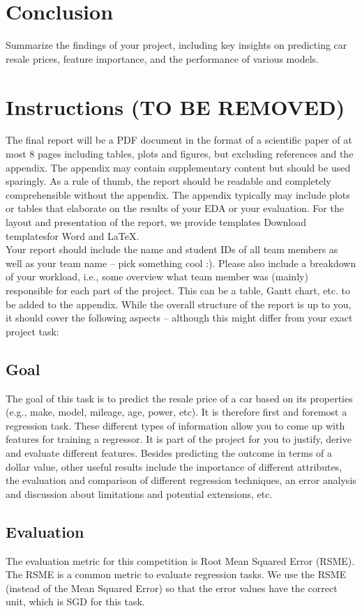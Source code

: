 \documentclass[conference]{IEEEtran}
\begin{document}
\section{Conclusion}
\label{sec:conclusion}
Summarize the findings of your project, including key insights on predicting car resale prices, feature importance, and the performance of various models.


\newpage
\section{Instructions (TO BE REMOVED)}
The final report will be a PDF document in the format of a scientific paper of at most 8 pages including tables, plots and figures, but excluding references and the appendix. The appendix may contain supplementary content but should be used sparingly. As a rule of thumb, the report should be readable and completely comprehensible without the appendix. The appendix typically may include plots or tables that elaborate on the results of your EDA or your evaluation. For the layout and presentation of the report, we provide templates Download templatesfor Word and LaTeX.
\\
Your report should include the name and student IDs of all team members as well as your team name – pick something cool :). Please also include a breakdown of your workload, i.e., some overview what team member was (mainly) responsible for each part of the project. This can be a table, Gantt chart, etc. to be added to the appendix. While the overall structure of the report is up to you, it should cover the following aspects – although this might differ from your exact project task:
\subsection{Goal}
The goal of this task is to predict the resale price of a car based on its properties 
(e.g., make, model, mileage, age, power, etc). It is therefore first and foremost a regression task. 
These different types of information allow you to come up with features for training a regressor. 
It is part of the project for you to justify, derive and evaluate different features. 
Besides predicting the outcome in terms of a dollar value, other useful results include the importance of 
different attributes, the evaluation and comparison of different regression techniques, an error analysis 
and discussion about limitations and potential extensions, etc.
\subsection{Evaluation}
The evaluation metric for this competition is Root Mean Squared Error (RSME). The RSME is a common metric to evaluate regression tasks. We use the RSME (instead of the Mean Squared Error) so that the error values have the correct unit, which is SGD for this task.
\end{document}
